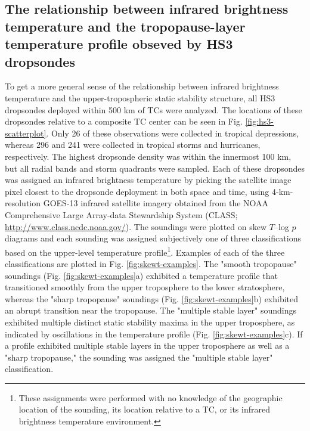 \subsection{The relationship between infrared brightness temperature and the tropopause-layer temperature profile obseved by HS3 dropsondes}
To get a more general sense of the relationship between infrared brightness temperature and the upper-tropospheric static stability structure, all HS3 dropsondes deployed within 500 km of TCs were analyzed.
The locations of these dropsondes relative to a composite TC center can be seen in Fig. \ref{fig:hs3-scatterplot}.
Only 26 of these observations were collected in tropical depressions, whereas 296 and 241 were collected in tropical storms and hurricanes, respectively.
The highest dropsonde density was within the innermost 100 km, but all radial bands and storm quadrants were sampled.
Each of these dropsondes was assigned an infrared brightness temperature by picking the satellite image pixel closest to the dropsonde deployment in both space and time, using 4-km-resolution GOES-13 infrared satellite imagery obtained from the NOAA Comprehensive Large Array-data Stewardship System (CLASS; \url{http://www.class.ncdc.noaa.gov/}).
The soundings were plotted on skew $T$--log $p$ diagrams and each sounding was assigned subjectively one of three classifications based on the upper-level temperature profile\footnote{These assignments were performed with no knowledge of the geographic location of the sounding, its location relative to a TC, or its infrared brightness temperature environment.}.
Examples of each of the three classifications are plotted in Fig. \ref{fig:skewt-examples}.
The "smooth tropopause" soundings (Fig. \ref{fig:skewt-examples}a) exhibited a temperature profile that transitioned smoothly from the upper troposphere to the lower stratosphere, whereas the "sharp tropopause" soundings (Fig. \ref{fig:skewt-examples}b) exhibited an abrupt transition near the tropopause.
The "multiple stable layer" soundings exhibited multiple distinct static stability maxima in the upper troposphere, as indicated by oscillations in the temperature profile (Fig. \ref{fig:skewt-examples}c).
If a profile exhibited multiple stable layers in the upper troposphere as well as a "sharp tropopause," the sounding was assigned the "multiple stable layer" classification.

